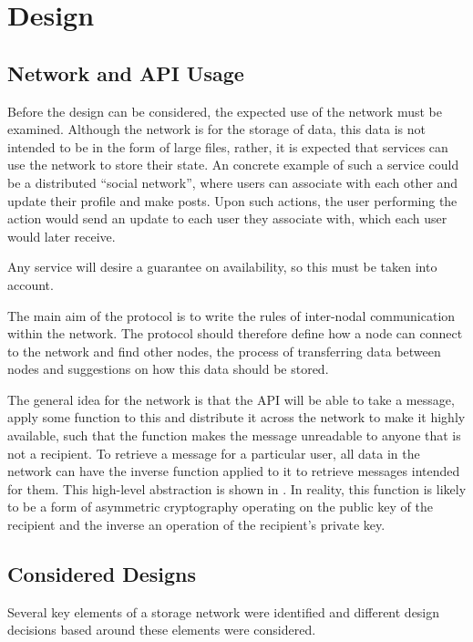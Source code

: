 \section{Design} \label{design}

	\subsection{Network and API Usage}

	Before the design can be considered, the expected use of the network must be examined. Although the network is for the storage of data, this data is not intended to be in the form of large files, rather, it is expected that services can use the network to store their state. An concrete example of such a service could be a distributed ``social network'', where users can associate with each other and update their profile and make posts. Upon such actions, the user performing the action would send an update to each user they associate with, which each user would later receive.

	Any service will desire a guarantee on availability, so this must be taken into account.

	The main aim of the protocol is to write the rules of inter-nodal communication within the network. The protocol should therefore define how a node can connect to the network and find other nodes, the process of transferring data between nodes and suggestions on how this data should be stored. 

	The general idea for the network is that the API will be able to take a message, apply some function to this and distribute it across the network to make it highly available, such that the function makes the message unreadable to anyone that is not a recipient. To retrieve a message for a particular user, all data in the network can have the inverse function applied to it to retrieve messages intended for them. This high-level abstraction is shown in . In reality, this function is likely to be a form of asymmetric cryptography operating on the public key of the recipient and the inverse an operation of the recipient's private key.
	
	\subsection{Considered Designs}
		Several key elements of a storage network were identified and different design decisions based around these elements were considered. 
		
